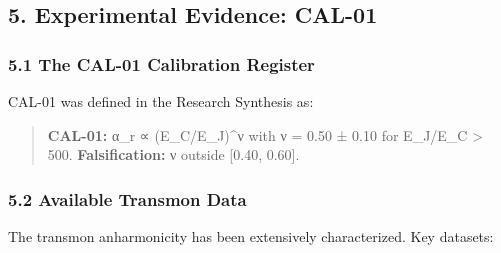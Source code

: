 \documentclass[
]{article}
\begin{document}
\subsection{5. Experimental Evidence:
CAL-01}\label{experimental-evidence-cal-01}

\subsubsection{5.1 The CAL-01 Calibration
Register}\label{the-cal-01-calibration-register}

CAL-01 was defined in the Research Synthesis as:

\begin{quote}
\textbf{CAL-01:} α\_r ∝ (E\_C/E\_J)\^{}ν with ν = 0.50 ± 0.10 for
E\_J/E\_C \textgreater{} 500. \textbf{Falsification:} ν outside {[}0.40,
0.60{]}.
\end{quote}

\subsubsection{5.2 Available Transmon
Data}\label{available-transmon-data}

The transmon anharmonicity has been extensively characterized. Key
datasets:
\end{document}
